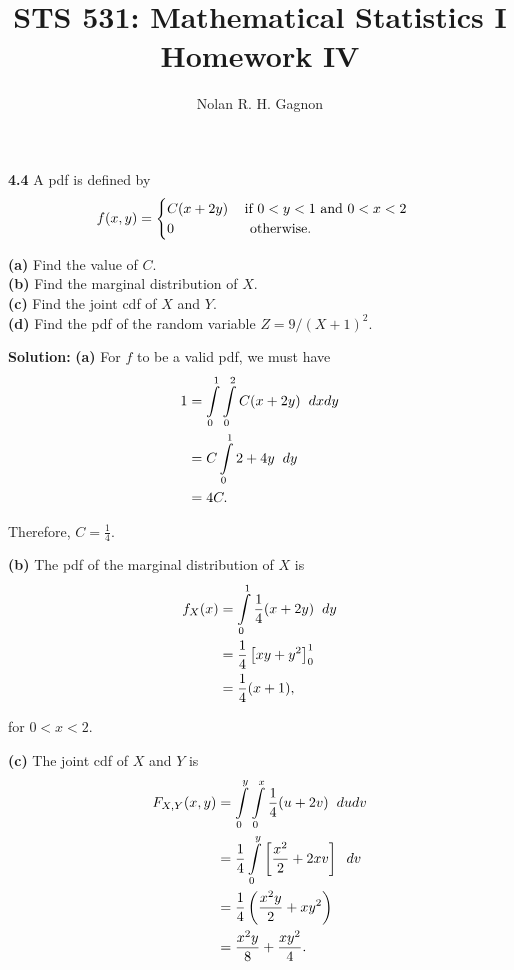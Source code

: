 \documentclass{article}
\title{STS 531:  Mathematical Statistics I \\
	   \textbf{Homework IV}}
\author{Nolan R. H. Gagnon}
\newcommand{\mybox}{%
    \collectbox{%
        \setlength{\fboxsep}{1pt}%
        \fbox{\BOXCONTENT}%
    }%
}
\begin{document}
\maketitle

\noindent\mybox{\textbf{4.4}}  A pdf is defined by 
$$f(x,y) =
\begin{cases}
C(x+2y) \hspace{3mm} \text{ if } 0 < y < 1 \text{ and } 0 < x < 2 \\
0 \hspace{18mm} \text{ otherwise.}
\end{cases}
$$

\noindent\textbf{(a)}  Find the value of $C$. \\
\textbf{(b)}  Find the marginal distribution of $X$. \\
\textbf{(c)}  Find the joint cdf of $X$ and $Y$.  \\
\textbf{(d)}  Find the pdf of the random variable $Z=9/(X+1)^2$. \\

\vspace{3mm}

\noindent\mybox{\textbf{Solution:}}  \textbf{(a)}  For $f$ to be a valid pdf, we must have  
\begin{align}
1 &= \int\limits_{0}^{1}\int\limits_{0}^{2} C(x+2y) \hspace{2mm} dxdy \\
&= C\int\limits_{0}^{1} 2 + 4y \hspace{2mm} dy \\
&= 4C.
\end{align}

\noindent Therefore, $C = \frac{1}{4}.$  

\vspace{3mm}

\noindent \textbf{(b)}  The pdf of the marginal distribution of $X$ is
\begin{align}
f_X(x) &= \int\limits_{0}^{1} \frac{1}{4}(x+2y) \hspace{2mm} dy \\
&= \frac{1}{4}\left[xy + y^2\right]_0^1 \\
&= \frac{1}{4}(x+1),
\end{align}

\noindent for $0< x < 2$.  

\vspace{3mm}

\noindent\textbf{(c)}  The joint cdf of $X$ and $Y$ is 
\begin{align}
F_{X,Y}(x,y) &= \int\limits_{0}^{y}\int\limits_{0}^{x} \frac{1}{4}(u+2v) \hspace{2mm} dudv \\
&= \frac{1}{4}\int\limits_{0}^{y} \left[\frac{x^2}{2}+2xv\right] \hspace{2mm} dv \\
&= \frac{1}{4} \left(\frac{x^2y}{2} + xy^2\right) \\
&= \frac{x^2y}{8} + \frac{xy^2}{4}.
\end{align}
\end{document}
